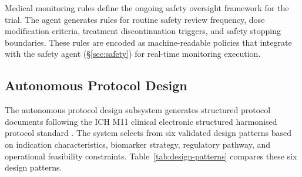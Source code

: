 Medical monitoring rules define the ongoing safety oversight framework for the trial.
The agent generates rules for routine safety review frequency, dose modification
criteria, treatment discontinuation triggers, and safety stopping boundaries. These
rules are encoded as machine-readable policies that integrate with the safety agent
(\S\ref{sec:safety}) for real-time monitoring execution.

\subsection{Autonomous Protocol Design}

The autonomous protocol design subsystem generates structured protocol documents following
the ICH M11 clinical electronic structured harmonised protocol standard \cite{ich-m11}.
The system selects from six validated design patterns based on indication characteristics,
biomarker strategy, regulatory pathway, and operational feasibility constraints.
Table~\ref{tab:design-patterns} compares these six design patterns.

